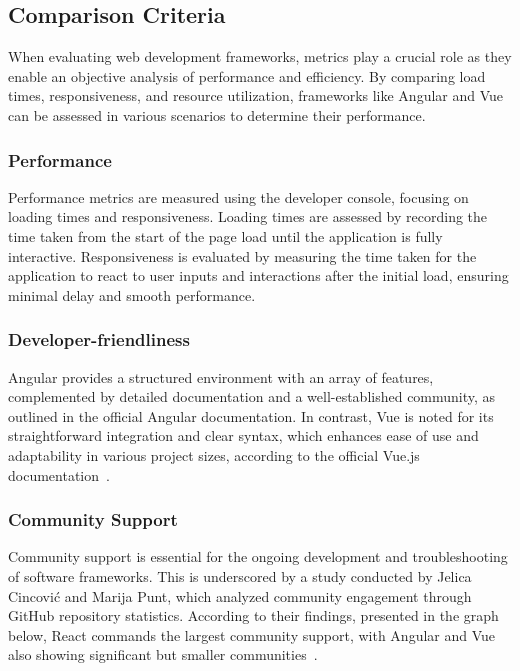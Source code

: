\documentclass[conference]{IEEEtran}
\begin{document}
\subsection {Comparison Criteria}

When evaluating web development frameworks, metrics play a crucial role as they enable an objective analysis of performance and efficiency. By comparing load times, responsiveness, and resource utilization, frameworks like Angular and Vue can be assessed in various scenarios to determine their performance.
\newline
\subsubsection{Performance}
Performance metrics are measured using the developer console, focusing on loading times and responsiveness. Loading times are assessed by recording the time taken from the start of the page load until the application is fully interactive. Responsiveness is evaluated by measuring the time taken for the application to react to user inputs and interactions after the initial load, ensuring minimal delay and smooth performance.
\newline\subsubsection{Developer-friendliness}
Angular provides a structured environment with an array of features, complemented by detailed documentation and a well-established community, as outlined in the official Angular documentation. In contrast, Vue is noted for its straightforward integration and clear syntax, which enhances ease of use and adaptability in various project sizes, according to the official Vue.js documentation~\cite{angular, vue}.
\newline
\subsubsection{Community Support}
Community support is essential for the ongoing development and troubleshooting of software frameworks. This is underscored by a study conducted by Jelica Cincović and Marija Punt, which analyzed community engagement through GitHub repository statistics. According to their findings, presented in the graph below, React commands the largest community support, with Angular and Vue also showing significant but smaller communities~\cite{cincovic2020comparison}.
\newline
\end{document}
